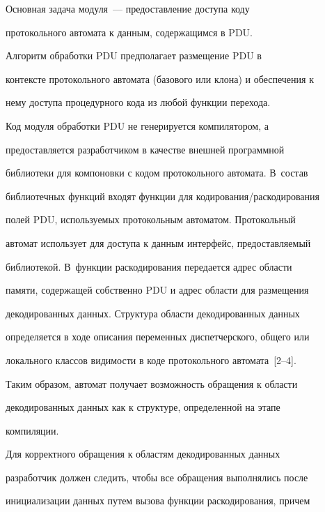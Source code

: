       


      Основная задача модуля~--- предоставление доступа коду 


протокольного автомата к данным, содержащимся в PDU.


      


      Алгоритм обработки PDU предполагает размещение PDU в 


контексте протокольного автомата (базового или клона) и обеспечения к 


нему доступа процедурного кода из любой функции перехода.


      


      Код модуля обработки PDU не генерируется компилятором, а 


предоставляется разработчиком в качестве внешней программной 


библиотеки для компоновки с кодом протокольного автомата. В~состав 


библиотечных функций  входят функции для кодирования/\!раскодирования 


полей PDU, используемых протокольным автоматом. Протокольный 


автомат использует для доступа к данным интерфейс, предоставляемый 


библиотекой. В~функции раскодирования передается адрес области 


памяти, содержащей собственно PDU и адрес области для размещения 


декодированных данных. Структура области декодированных данных 


определяется в ходе описания переменных диспетчерского, общего или 


локального классов видимости в коде протокольного автомата~[2--4]. 


Таким образом, автомат получает возможность обращения к области 


декодированных данных как к структуре, определенной на этапе 


компиляции. 


      


      Для корректного обращения к областям декодированных данных 


разработчик должен следить, чтобы все обращения выполнялись после 


инициализации данных путем вызова функции раскодирования, причем 


